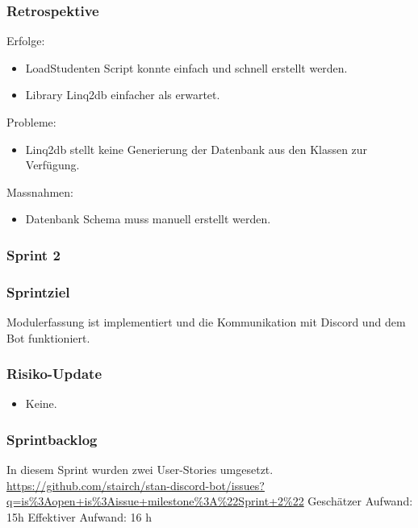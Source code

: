\documentclass[a4paper, table]{article}
\begin{document}
\subsubsection*{Retrospektive}
Erfolge:
\begin{itemize}
    \item LoadStudenten Script konnte einfach und schnell erstellt werden.
    \item Library Linq2db einfacher als erwartet.
\end{itemize}
Probleme:
\begin{itemize}
    \item Linq2db stellt keine Generierung der Datenbank aus den Klassen zur Verfügung.
\end{itemize}
Massnahmen:
\begin{itemize}
    \item Datenbank Schema muss manuell erstellt werden.
\end{itemize}
\newpage

\subsubsection{Sprint 2}
\subsubsection*{Sprintziel}
Modulerfassung ist implementiert und die Kommunikation mit Discord und dem Bot funktioniert.

\subsubsection*{Risiko-Update}
\begin{itemize}
    \item Keine.
\end{itemize}

\subsubsection*{Sprintbacklog}
In diesem Sprint wurden zwei User-Stories umgesetzt.\\
\url{https://github.com/stairch/stan-discord-bot/issues?q=is%3Aopen+is%3Aissue+milestone%3A%22Sprint+2%22}
\newline
Geschätzer Aufwand: 15h
\newline
Effektiver Aufwand: 16 h
\end{document}
